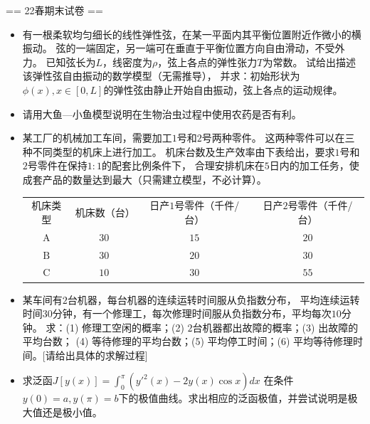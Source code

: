 == 22春期末试卷 ==

\begin{itemize}
    \item[1、] 有一根柔软均匀细长的线性弹性弦，在某一平面内其平衡位置附近作微小的横振动。
    弦的一端固定，另一端可在垂直于平衡位置方向自由滑动，不受外力。
    已知弦长为$L$，线密度为$\rho$，弦上各点的弹性张力$T$为常数。
    试给出描述该弹性弦自由振动的数学模型（无需推导），
    并求：初始形状为$\phi(x),x\in[0,L]$的弹性弦由静止开始自由振动，弦上各点的运动规律。
    \item[2、] 请用大鱼---小鱼模型说明在生物治虫过程中使用农药是否有利。
    \item[3、] 某工厂的机械加工车间，需要加工$1$号和$2$号两种零件。
    这两种零件可以在三种不同类型的机床上进行加工。
    机床台数及生产效率由下表给出，要求$1$号和$2$号零件在保持$1:1$的配套比例条件下，
    合理安排机床在$5$日内的加工任务，使成套产品的数量达到最大（只需建立模型，不必计算）。
    \begin{table}\begin{tabular}{|c|c|c|c|}
        机床类型 & 机床数（台） & 日产$1$号零件（千件/台） & 日产$2$号零件（千件/台）\\
        $\text{A}$ & $30$ & $15$ & $20$ \\
        $\text{B}$ & $30$ & $20$ & $30$ \\
        $\text{C}$ & $10$ & $30$ & $55$ 
    \end{tabular}\end{table}
    \item[4、] 某车间有$2$台机器，每台机器的连续运转时间服从负指数分布，
    平均连续运转时间$30$分钟，有一个修理工，每次修理时间服从负指数分布，平均每次$10$分钟。
    求：(1) 修理工空闲的概率；(2) $2$台机器都出故障的概率；(3) 出故障的平均台数；
    (4) 等待修理的平均台数；(5) 平均停工时间；(6) 平均等待修理时间。[请给出具体的求解过程]
    \item[5、] 求泛函$J[y(x)]=\int_0^\pi(y'^2(x)-2y(x)\cos x)dx$
    在条件$y(0)=a,y(\pi)=b$下的极值曲线。求出相应的泛函极值，并尝试说明是极大值还是极小值。
\end{itemize}